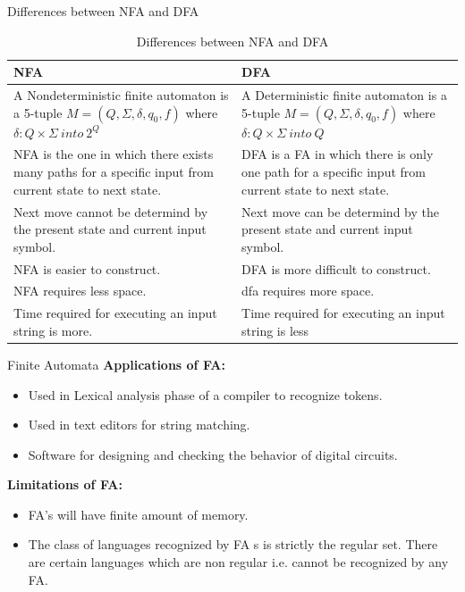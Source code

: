 \documentclass{beamer}
\begin{document}
\begin{frame}{Differences between NFA and DFA}
\begin{center}
	\begin{table}
		\begin{tabular}{|p{5.5cm}|p{5.5cm}|}
			\hline
			\centering	\textbf{NFA} & 	\textbf{DFA}\\
			\hline
			A Nondeterministic finite automaton is a 5-tuple $M=(Q,\Sigma,\delta,q_0,f)$  where $\delta: Q\times \Sigma \ into \ 2^Q$ & A Deterministic finite 
			automaton is a 5-tuple $M=(Q,\Sigma,\delta,q_0,f)$  where $\delta: Q\times \Sigma \ into \ Q$ \\
			\hline
			NFA is the one in which there 
			exists many paths for a specific 
			input from current state to next 
			state.
 & DFA is a FA in which there is only 
			one path for a specific input from 
			current state to next state.\\
			\hline
			Next move cannot be determind by the present state and current input symbol. & Next move can be determind by the present state and current input symbol.\\
			\hline
			NFA is easier to construct. & DFA is more difficult to construct.\\
			\hline
			NFA requires less space. & dfa requires more space.\\
			\hline
			Time required for executing an 
			input string is more. & Time required for executing an 
			input string is less\\
			\hline
		\end{tabular}
	\caption{Differences between NFA and DFA}
	\end{table}
\end{center}
\end{frame}
\begin{frame}{Finite Automata}
	\textbf{Applications of FA:}
\begin{itemize}
	\item Used in Lexical analysis phase of a compiler to recognize tokens.
	\item Used in text editors for string matching.
	\item Software for designing and checking the behavior of digital circuits.
\end{itemize}
		\textbf{Limitations of FA:}
		\begin{itemize}
\item FA’s will have finite amount of memory.
\item The class of languages recognized by FA s is strictly the regular set. 
	There are certain languages which are non regular i.e. cannot be 
	recognized by any FA.

\end{itemize}
\end{frame}
\end{document}
